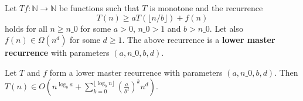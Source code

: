 \begin{definition}
    \label{def:lower_master_rec}
    \leanok
    Let $T f : \mathbb{N} \rightarrow \mathbb{N}$ be functions such that $T$ 
    is monotone and the recurrence
    \[
        T(n) \geq a T(\lfloor n/b \rfloor) + f(n)
    \]
    holds for all $n \ge n\_0$ for some $a > 0$, $n\_0 > 1$ and $b > n\_0$. 
    Let also $f(n) \in \Omega(n^d)$ for some $d \ge 1$. The above recurrence 
    is a \textbf{lower master recurrence} with parameters $(a, n\_0, b, d)$.
\end{definition}

\begin{lemma}
    \label{lemma:big_o_geom}
    \leanok
    Let $T$ and $f$ form a lower master recurrence with parameters 
    $(a, n\_0, b, d)$. Then $T(n) \in O(n^{\log_b{a}} + 
    \sum_{k=0}^{\lfloor \log_b{n} \rfloor} (\frac{a}{b^d})^k n^d)$.
\end{lemma}

